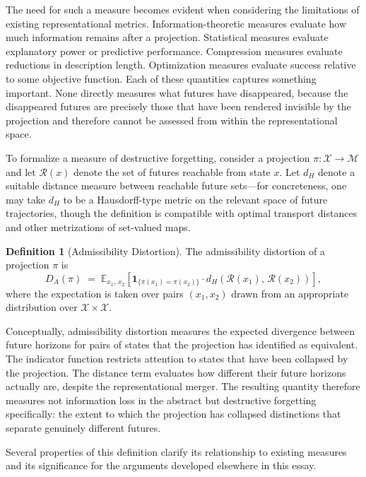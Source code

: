 \documentclass[12pt,a4paper]{article}
\theoremstyle{plain}
\theoremstyle{definition}
\newtheorem{definition}{Definition}
\theoremstyle{remark}
\begin{document}
The need for such a measure becomes evident when considering the limitations
of existing representational metrics. Information-theoretic measures evaluate
how much information remains after a projection. Statistical measures
evaluate explanatory power or predictive performance. Compression measures
evaluate reductions in description length. Optimization measures evaluate
success relative to some objective function. Each of these quantities
captures something important. None directly measures what futures have
disappeared, because the disappeared futures are precisely those that have
been rendered invisible by the projection and therefore cannot be assessed
from within the representational space.

To formalize a measure of destructive forgetting, consider a projection
$\pi : \mathcal{X} \rightarrow \mathcal{M}$ and let $\mathcal{R}(x)$
denote the set of futures reachable from state $x$. Let $d_H$ denote a
suitable distance measure between reachable future sets---for concreteness,
one may take $d_H$ to be a Hausdorff-type metric on the relevant space of
future trajectories, though the definition is compatible with optimal
transport distances and other metrizations of set-valued maps.

\begin{definition}[Admissibility Distortion]
The admissibility distortion of a projection $\pi$ is
\[
  D_A(\pi)
  \;=\;
  \mathbb{E}_{x_1,\,x_2}
  \!\left[
    \mathbf{1}_{\{\pi(x_1)=\pi(x_2)\}}
    \cdot
    d_H\!\left(\mathcal{R}(x_1),\,\mathcal{R}(x_2)\right)
  \right],
\]
where the expectation is taken over pairs $(x_1, x_2)$ drawn from an
appropriate distribution over $\mathcal{X} \times \mathcal{X}$.
\end{definition}

Conceptually, admissibility distortion measures the expected divergence
between future horizons for pairs of states that the projection has identified
as equivalent. The indicator function restricts attention to states that have
been collapsed by the projection. The distance term evaluates how different
their future horizons actually are, despite the representational merger.
The resulting quantity therefore measures not information loss in the abstract
but destructive forgetting specifically: the extent to which the projection
has collapsed distinctions that separate genuinely different futures.

Several properties of this definition clarify its relationship to existing
measures and its significance for the arguments developed elsewhere in this
essay.
\end{document}
